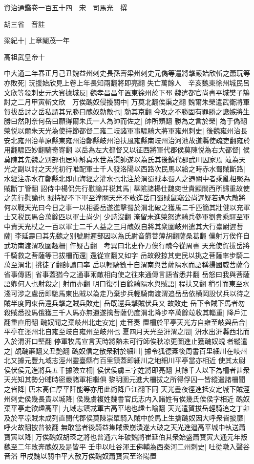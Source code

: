 資治通鑑卷一百五十四　宋　司馬光　撰

胡三省　音註

梁紀十|{
	上章閹茂一年}


高祖武皇帝十

中大通二年春正月己丑魏益州刺史長孫壽梁州刺史元儁等遣將擊嚴始欣斬之蕭玩等亦敗死|{
	玩援始欣見上卷上年長知兩翻將即亮翻}
失亡萬餘人　辛亥魏東徐州城民呂文欣等殺刺史元大賓據城反|{
	魏孝昌昌年置東徐州於下邳}
魏遣都官尚書平城樊子鵠討之二月甲寅斬文欣　万俟醜奴侵擾關中|{
	万莫北翻俟渠之翻}
魏爾朱榮遣武衛將軍賀拔岳討之岳私謂其兄勝曰醜奴勍敵也|{
	勍其京翻}
今攻之不勝固有罪勝之讒嫉將生勝曰然則奈何岳曰願得爾朱氏一人為帥而佐之|{
	帥所類翻}
勝為之言於榮|{
	為于偽翻}
榮悦以爾朱天光為使持節都督二雍二岐諸軍事驃騎大將軍雍州刺史|{
	後魏雍州治長安北雍州治蕐原縣東雍州治鄭縣岐州治扶風雍縣南岐州治河池故道縣使疏吏翻雍於用翻驃匹妙翻騎奇寄翻}
以岳為左大都督又以征西將軍代郡侯莫陳悦為右大都督|{
	侯莫陳其先魏之别部也居庫斛真水世為渠帥遂以為氏其後鎮代郡武川因家焉}
竝為天光之副以討之天光初行唯配軍士千人發洛陽以西路次民馬以給之時赤水蜀賊斷路|{
	水經注赤水在鄭縣北即山海經之灌水也北注於渭蜀賊本蜀人之遷關中者乘亂相聚為賊斷丁管翻}
詔侍中楊侃先行慰諭并税其馬|{
	蕐隂諸楊仕魏奕世貴顯關西所歸重故使之先行慰諭也}
賊持疑不下軍至潼關天光不敢進岳曰蜀賊鼠竊公尚遲疑若遇大敵將何以戰天光曰今日之事一以相委岳遂進擊蜀於渭北破之獲馬二千匹簡其壯健以充軍士又税民馬合萬餘匹以軍士尚少|{
	少詩沒翻}
淹留未進榮怒遣騎兵參軍劉貴乘驛至軍中責天光杖之一百以軍士二千人益之三月醜奴自將其衆圍岐州遣其大行臺尉遲菩薩|{
	李延壽曰其先魏之别號尉遲部因以為氏尉音欝菩薄胡翻薩桑葛翻}
僕射万俟仵自武功南渡渭攻圍趣柵|{
	仵疑古翻　考異曰北史作万俟行醜今從周書}
天光使賀拔岳將千騎救之菩薩等已拔柵而還|{
	還從宣翻又如字}
岳故殺掠其吏民以挑之菩薩率步騎二萬至渭北|{
	挑徒了翻帥讀曰率}
岳以輕騎數十自渭南與菩薩隔水而語稱揚國威菩薩令省事傳語|{
	省事蓋猶今之通事兩敵相向使之往來通傳言語省悉井翻}
岳怒曰我與菩薩語卿何人也射殺之|{
	射而亦翻}
明曰復引百餘騎隔水與賊語|{
	程扶又翻}
稍引而東至水淺可涉之處岳即馳馬東出賊以為走乃棄步兵輕騎南渡渭追岳岳依横岡設伏兵以待之賊半度岡東岳還兵擊之賊兵敗走|{
	岳既還兵擊賊伏兵又故敗走}
岳下令賊下馬者勿殺賊悉投馬俄獲三千人馬亦無遺遂擒菩薩仍度渭北降步卒萬餘竝收其輜重|{
	降戶江翻重直用翻}
醜奴聞之棄岐州北走安定|{
	走音奏}
置柵於平亭天光方自雍至岐與岳合|{
	平亭在涇州北自雍至岐自雍州至岐州也}
夏四月天光至汧渭之間|{
	汧水出汧縣西北而入於渭汧口堅翻}
停軍牧馬宣言天時將熱未可行師俟秋凉更圖進止獲醜奴覘者縱遣之|{
	覘醜亷翻又丑艶翻}
醜奴信之散衆耕於細川|{
	據令狐德棻後周書百里細川在岐州北又據元豐九域志涇州靈臺縣冇百里鎮蓋即細川之地細川平亭當亦相近}
使其太尉侯伏侯元進將兵五千據險立柵|{
	侯伏侯虜三字姓將即亮翻}
其餘千人以下為柵者甚衆天光知其勢分晡時密嚴諸軍相繼俱黎明圍元進大柵拔之所得俘囚一皆縱遣諸柵聞之皆降|{
	唐末高仁厚平阡能等亦用此術降戶江翻下同}
天光晝夜徑進抵安定城下賊涇州刺史侯幾長貴以城降|{
	侯幾虜複姓魏書官氏志内入諸姓有俟幾氏俟侯字相近}
醜奴棄平亭走欲趣高平|{
	九域志鎮戎軍古高平地也趣七喻翻}
天光遣賀拔岳輕騎追之丁卯及於平凉賊未成列直閤代郡侯莫陳崇單騎入賊中於馬上生擒醜奴因大呼衆皆披靡|{
	呼火故翻披普彼翻}
無敢當者後騎益集賊衆崩潰遂大破之天光進逼高平城中執送蕭寶寅以降|{
	万俟醜奴胡琛之將也普通六年破魏將崔延伯其衆始盛蕭寶寅大通元年叛魏至二年敗奔醜奴及是皆平}
壬申以吐谷渾王佛輔為西秦河二州刺史|{
	吐從暾入聲谷音浴}
甲戌魏以關中平大赦万俟醜奴蕭寶寅至洛陽置

